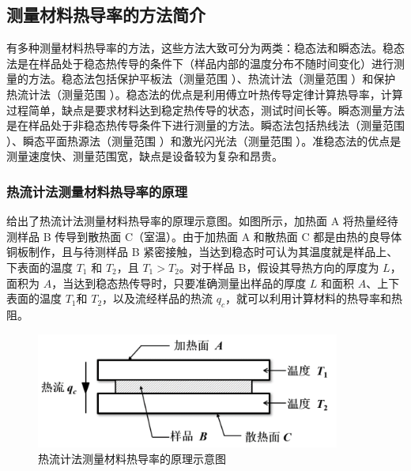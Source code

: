 \documentclass[a4paper,utf8]{article}
\begin{document}
    \subsection{测量材料热导率的方法简介}
        有多种测量材料热导率的方法，这些方法大致可分为两类：稳态法和瞬态法。稳态法是在样品处于稳态热传导的条件下（样品内部的温度分布不随时间变化）进行测量的方法。稳态法包括保护平板法（测量范围 ）、热流计法（测量范围 ）和保护热流计法（测量范围 ）。稳态法的优点是利用傅立叶热传导定律计算热导率，计算过程简单，缺点是要求材料达到稳定热传导的状态，测试时间长等。瞬态测量方法是在样品处于非稳态热传导条件下进行测量的方法。瞬态法包括热线法（测量范围 ）、瞬态平面热源法（测量范围 ）和激光闪光法（测量范围 ）。准稳态法的优点是测量速度快、测量范围宽，缺点是设备较为复杂和昂贵。
        \subsubsection{热流计法测量材料热导率的原理}
             给出了热流计法测量材料热导率的原理示意图。如图所示，加热面 A 将热量经待测样品 B 传导到散热面 C（室温）。由于加热面 A 和散热面 C 都是由热的良导体铜板制作，且与待测样品 B 紧密接触，当达到稳态时可认为其温度就是样品上、下表面的温度 $T_1$ 和 $T_2$，且 $T_1 > T_2$。对于样品 B，假设其导热方向的厚度为 $L$，面积为 $A$，当达到稳态热传导时，只要准确测量出样品的厚度 $L$ 和面积 $A$、上下表面的温度 $T_1$和 $T_2$，以及流经样品的热流 $q_c$，就可以利用计算材料的热导率和热阻。
            \begin{figure}[!ht]\centering
                \includegraphics[width=100mm]{fg1.png}
                \caption{热流计法测量材料热导率的原理示意图 \label{fg:1}}
            \end{figure}
\end{document}
